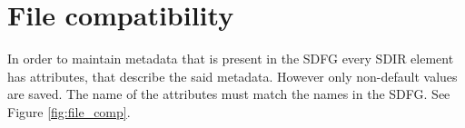 \section{File compatibility} \label{file_comp}
In order to maintain metadata that is present in the SDFG every SDIR element has attributes, that describe the said metadata. However only non-default values are saved. The name of the attributes must match the names in the SDFG. See Figure \ref{fig:file_comp}.
